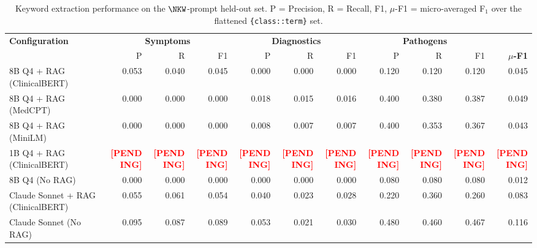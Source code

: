 \begin{table}[t]
\centering
\caption{Keyword extraction performance on the $\NKW$-prompt
held-out set. P = Precision, R = Recall, F1, $\mu$-F1 = micro-averaged
F$_1$ over the flattened \texttt{\{class::term\}} set.}
\label{tab:keywords}
\setlength{\tabcolsep}{4pt}
\begin{tabular}{@{}lrrrrrrrrrr@{}}
\toprule
\textbf{Configuration} & \multicolumn{3}{c}{\textbf{Symptoms}} & \multicolumn{3}{c}{\textbf{Diagnostics}} & \multicolumn{3}{c}{\textbf{Pathogens}} & \\
 & P & R & F1 & P & R & F1 & P & R & F1 & \textbf{$\mu$-F1} \\
\midrule
8B Q4 + RAG (ClinicalBERT) & 0.053 & 0.040 & 0.045 & 0.000 & 0.000 & 0.000 & 0.120 & 0.120 & 0.120 & 0.045 \\
8B Q4 + RAG (MedCPT) & 0.000 & 0.000 & 0.000 & 0.018 & 0.015 & 0.016 & 0.400 & 0.380 & 0.387 & 0.049 \\
8B Q4 + RAG (MiniLM) & 0.000 & 0.000 & 0.000 & 0.008 & 0.007 & 0.007 & 0.400 & 0.353 & 0.367 & 0.043 \\
1B Q4 + RAG (ClinicalBERT) & \textcolor{red}{\textbf{[PENDING]}} & \textcolor{red}{\textbf{[PENDING]}} & \textcolor{red}{\textbf{[PENDING]}} & \textcolor{red}{\textbf{[PENDING]}} & \textcolor{red}{\textbf{[PENDING]}} & \textcolor{red}{\textbf{[PENDING]}} & \textcolor{red}{\textbf{[PENDING]}} & \textcolor{red}{\textbf{[PENDING]}} & \textcolor{red}{\textbf{[PENDING]}} & \textcolor{red}{\textbf{[PENDING]}} \\
8B Q4 (No RAG) & 0.000 & 0.000 & 0.000 & 0.000 & 0.000 & 0.000 & 0.080 & 0.080 & 0.080 & 0.012 \\
Claude Sonnet + RAG (ClinicalBERT) & 0.055 & 0.061 & 0.054 & 0.040 & 0.023 & 0.028 & 0.220 & 0.360 & 0.260 & 0.083 \\
Claude Sonnet (No RAG) & 0.095 & 0.087 & 0.089 & 0.053 & 0.021 & 0.030 & 0.480 & 0.460 & 0.467 & 0.116 \\
\bottomrule
\end{tabular}
\end{table}

